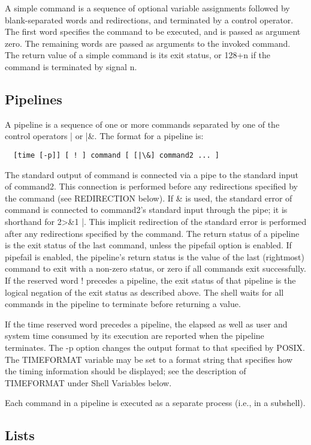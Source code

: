 \documentclass[11pt]{article}
\begin{document}
A simple command is a sequence of optional variable assignments followed by blank-separated words and redirections, and terminated by a control operator. The first word specifies the command to be executed, and is passed as argument zero. The remaining words are passed as arguments to the invoked command.
The return value of a simple command is its exit status, or 128+n if the command is terminated by signal n.

\subsection{Pipelines}

A pipeline is a sequence of one or more commands separated by one of the control operators | or |\&. The format for a pipeline is:
\begin{lstlisting}
  [time [-p]] [ ! ] command [ [|\&] command2 ... ]
\end{lstlisting}
The standard output of command is connected via a pipe to the standard input of command2. This connection is performed before any redirections specified by the command (see REDIRECTION below). If \& is used, the standard error of command is connected to command2's standard input through the pipe; it is shorthand for 2>\&1 |. This implicit redirection of the standard error is performed after any redirections specified by the command.
The return status of a pipeline is the exit status of the last command, unless the pipefail option is enabled. If pipefail is enabled, the pipeline's return status is the value of the last (rightmost) command to exit with a non-zero status, or zero if all commands exit successfully. If the reserved word ! precedes a pipeline, the exit status of that pipeline is the logical negation of the exit status as described above. The shell waits for all commands in the pipeline to terminate before returning a value.

If the time reserved word precedes a pipeline, the elapsed as well as user and system time consumed by its execution are reported when the pipeline terminates. The -p option changes the output format to that specified by POSIX. The TIMEFORMAT variable may be set to a format string that specifies how the timing information should be displayed; see the description of TIMEFORMAT under Shell Variables below.

Each command in a pipeline is executed as a separate process (i.e., in a subshell).

\subsection{Lists}
\end{document}
